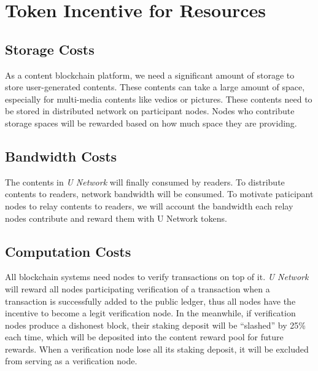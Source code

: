 \section{Token Incentive for Resources}


\subsection{Storage Costs}
As a content blockchain platform, we need a significant amount of storage to store user-generated contents. These contents can take a large amount of space, especially for multi-media contents like vedios or pictures. These contents need to be stored in distributed network on participant nodes. Nodes who contribute storage spaces will be rewarded based on how much space they are providing.

\subsection{Bandwidth Costs}
The contents in \emph{U Network} will finally consumed by readers. To distribute contents to readers, network bandwidth will be consumed. To motivate paticipant nodes to relay contents to readers, we will account the bandwidth each relay nodes contribute and reward them with U Network tokens.

\subsection{Computation Costs}
All blockchain systems need nodes to verify transactions on top of it. \emph{U Network} will reward all nodes participating verification of a transaction when a transaction is successfully added to the public ledger, thus all nodes have the incentive to become a legit verification node. In the meanwhile, if verification nodes produce a dishonest block, their staking deposit will be ``slashed'' by 25\% each time, which will be deposited into the content reward pool for future rewards. When a verification node lose all its staking deposit, it will be excluded from serving as a verification node. 
